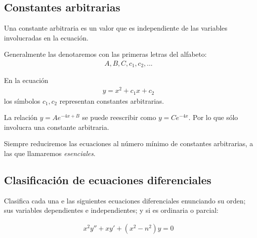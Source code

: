 \subsection{Constantes arbitrarias}

	Una constante arbitraria es un valor que es independiente de las variables involucradas en la ecuación.

	Generalmente las denotaremos con las primeras letras del alfabeto:
	\begin{align*}
		A,B,C,c_{1},c_{2},...
	\end{align*}


	\begin{ejemplo}
		En la ecuación
		\begin{align*}
		y = x^{2}+c_{1}x+c_{2}
		\end{align*}
		los símbolos $ c_{1}, c_{2} $ representan constantes arbitrarias.

	\end{ejemplo}


	\begin{ejemplo}
		La relación $ y = Ae^{-4x+B} $ se puede reescribir como $ y = Ce^{-4x} $.  Por lo que sólo involucra una constante arbitraria.
	\end{ejemplo}

\begin{observacion}

	Siempre reduciremos las ecuaciones al número mínimo de constantes arbitrarias, a las que llamaremos \emph{esenciales}.

\end{observacion}

\subsection{Clasificación de ecuaciones diferenciales}

\begin{resuelto}
	Clasifica cada una e las siguientes ecuaciones diferenciales enunciando su orden; sus variables dependientes e independientes; y si es ordinaria o parcial:
\end{resuelto}


\begin{align*}
	x^2y''+xy'+\left(x^2-n^2\right)y = 0
\end{align*}


